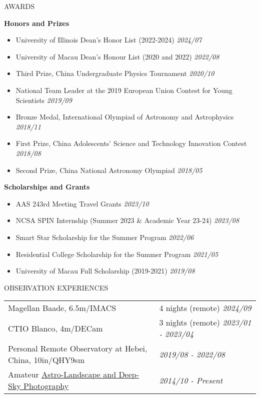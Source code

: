 \documentclass[11pt]{article} %
\begin{document}
\begin{section}{AWARDS}

\textbf{Honors and Prizes}

\begin{itemize}[leftmargin=1.5em]
    \item University of Illinois Dean's Honor List (2022-2024) \hfill \textit{2024/07}
    \item University of Macau Dean's Honour List (2020 and 2022) \hfill \textit{2022/08}
    \item Third Prize, China Undergraduate Physics Tournament \hfill \textit{2020/10}
    \item National Team Leader at the 2019 European Union Contest for Young Scientists \hfill \textit{2019/09}
    \item Bronze Medal, International Olympiad of Astronomy and Astrophysics \hfill \textit{2018/11}
    \item First Prize, China Adolescents' Science and Technology Innovation Contest \hfill \textit{2018/08}
    \item Second Prize, China National Astronomy Olympiad \hfill \textit{2018/05}
\end{itemize}
        
\textbf{Scholarships and Grants}

\begin{itemize}[leftmargin=1.5em]
    \item AAS 243rd Meeting Travel Grants \hfill \textit{2023/10}
    \item NCSA SPIN Internship (Summer 2023 \& Academic Year 23-24) \hfill \textit{2023/08}
    \item Smart Star Scholarship for the Summer Program \hfill \textit{2022/06}
    \item Residential College Scholarship for the Summer Program \hfill \textit{2021/05}
    \item University of Macau Full Scholarship (2019-2021) \hfill \textit{2019/08}
\end{itemize}
        
\end{section}

\begin{section}{OBSERVATION EXPERIENCES}

\begin{tabular}{@{}p{0.6\linewidth}@{}p{0.4\linewidth}@{}}
    Magellan Baade, 6.5m/IMACS & 4 nights (remote) \hfill \textit{2024/09} \\
    CTIO Blanco, 4m/DECam & 3 nights (remote) \hfill \textit{2023/01 - 2023/04} \\
    Personal Remote Observatory at Hebei, China, 10in/QHY9sm & \hfill \textit{2019/08 - 2022/08} \\
    Amateur \href{https://yliu.fit/astrophotography/}{Astro-Landscape and Deep-Sky Photography} & \hfill \textit{2014/10 - Present}
\end{tabular}

\end{section}
\end{document}
